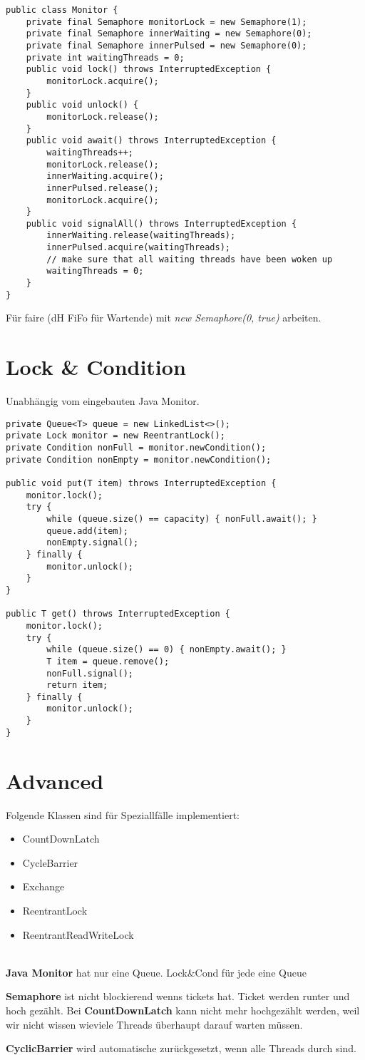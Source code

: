 \begin{lstlisting}
public class Monitor {
	private final Semaphore monitorLock = new Semaphore(1);
	private final Semaphore innerWaiting = new Semaphore(0);
	private final Semaphore innerPulsed = new Semaphore(0);
	private int waitingThreads = 0;
	public void lock() throws InterruptedException {
		monitorLock.acquire();
	}
	public void unlock() {
		monitorLock.release();
	}
	public void await() throws InterruptedException {
		waitingThreads++;
		monitorLock.release();
		innerWaiting.acquire();
		innerPulsed.release();
		monitorLock.acquire();
	}
	public void signalAll() throws InterruptedException {
		innerWaiting.release(waitingThreads);
		innerPulsed.acquire(waitingThreads);
		// make sure that all waiting threads have been woken up
		waitingThreads = 0;
	}
}
\end{lstlisting}
Für faire (dH FiFo für Wartende) mit \textit{new Semaphore(0, true)} arbeiten.


\section{Lock \& Condition}
Unabhängig vom eingebauten Java Monitor.
\begin{lstlisting}
private Queue<T> queue = new LinkedList<>();
private Lock monitor = new ReentrantLock();
private Condition nonFull = monitor.newCondition();
private Condition nonEmpty = monitor.newCondition();

public void put(T item) throws InterruptedException {
	monitor.lock();
	try {
		while (queue.size() == capacity) { nonFull.await(); }
		queue.add(item);
		nonEmpty.signal();
	} finally {
		monitor.unlock();
	}
}

public T get() throws InterruptedException {
	monitor.lock();
	try {
		while (queue.size() == 0) { nonEmpty.await(); }
		T item = queue.remove();
		nonFull.signal();
		return item;
	} finally {
		monitor.unlock();
	}
}
\end{lstlisting}

\section{Advanced}
Folgende Klassen sind für Speziallfälle implementiert:
\begin{itemize}[nosep]
	\item CountDownLatch
	\item CycleBarrier
	\item Exchange
	\item ReentrantLock
	\item ReentrantReadWriteLock	 
\end{itemize}

~\\
\textbf{Java Monitor} hat nur eine Queue. Lock\&Cond für jede eine Queue


\textbf{Semaphore} ist nicht blockierend wenns tickets hat. Ticket werden runter und hoch gezählt. Bei \textbf{CountDownLatch} kann nicht mehr hochgezählt werden, weil wir nicht wissen wieviele Threads überhaupt darauf warten müssen.


\textbf{CyclicBarrier} wird automatische zurückgesetzt, wenn alle Threads durch sind.
